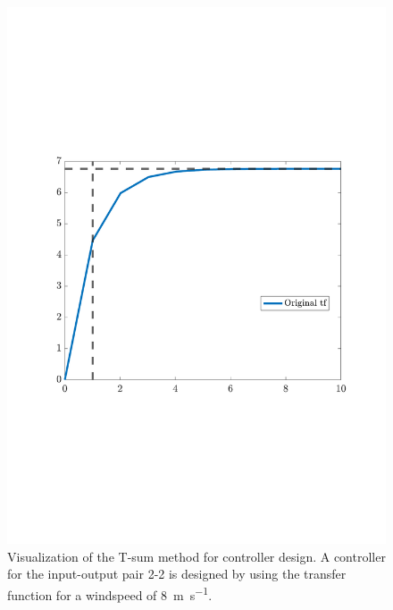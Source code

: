 \begin{figure}[H]
    \center
    \includegraphics[scale=0.7,trim=60 200 50 150,clip]{fig/G_22_T_sum_8ms.pdf}
    \caption{Visualization of the T-sum method for controller design. A controller for the input-output pair 2-2 is designed by using the transfer function for a windspeed of \SI{8}{\metre\per\second}.}
    \label{fig:condes:tsum:example}
\end{figure}



